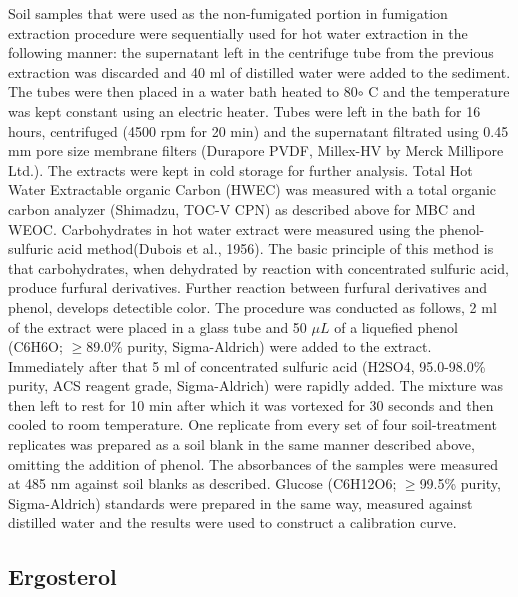 \documentclass[12pt]{report}
\begin{document}
    	Soil samples that were used as the non-fumigated portion in fumigation extraction procedure were sequentially used for hot water extraction in the following manner: the supernatant left in the centrifuge tube from the previous extraction was discarded and 40 ml of distilled water were added to the sediment. The tubes were then placed in a water bath heated to 80$\circ$ C and the temperature was kept constant using an electric heater. Tubes were left in the bath for 16 hours, centrifuged (4500 rpm for 20 min) and the supernatant filtrated using 0.45 mm pore size membrane filters (Durapore PVDF, Millex-HV by Merck Millipore Ltd.). The extracts were kept in cold storage for further analysis.
    	Total Hot Water Extractable organic Carbon (HWEC) was measured with a  total organic carbon analyzer (Shimadzu, TOC-V CPN) as described above for MBC and WEOC.
    	Carbohydrates in hot water extract were measured using the phenol-sulfuric acid method(Dubois et al., 1956). The basic principle of this method is that carbohydrates, when dehydrated by reaction with concentrated sulfuric acid, produce furfural derivatives. Further reaction between furfural derivatives and phenol, develops detectible color. The procedure was conducted as follows, 2 ml of the extract were placed in a glass tube and 50 $ \mu L $ of a liquefied phenol (C6H6O; $ \geq $89.0\% purity, Sigma-Aldrich) were added to the extract. Immediately after that 5 ml of concentrated sulfuric acid (H2SO4, 95.0-98.0\% purity, ACS reagent grade, Sigma-Aldrich) were rapidly added. The mixture was then left to rest for 10 min after which it was vortexed for 30 seconds and then cooled to room temperature. One replicate from every set of four soil-treatment replicates was prepared as a soil blank in the same manner described above, omitting the addition of phenol. The absorbances of the samples were measured at 485 nm against soil blanks as described. Glucose (C6H12O6; $ \geq $99.5\% purity, Sigma-Aldrich) standards were prepared in the same way, measured against distilled water and the results were used to construct a calibration curve. 
    	
		
    \subsection{Ergosterol}
    	
\end{document}
